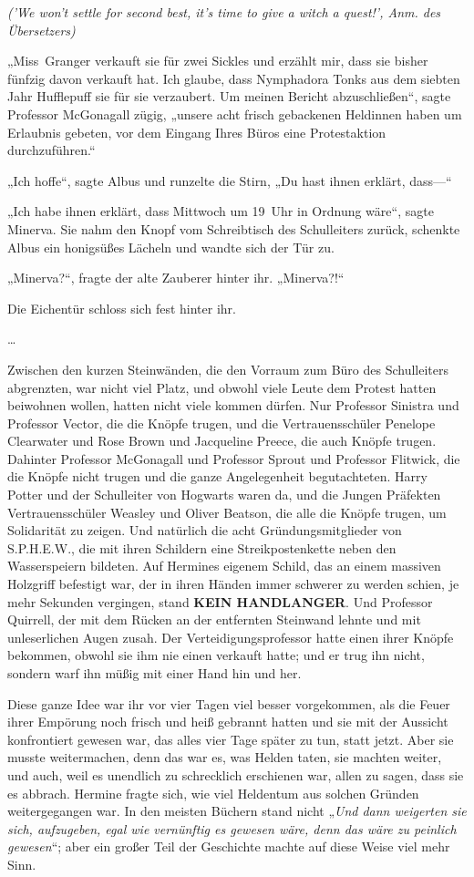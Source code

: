 {\emph{('We won't settle for second best, it's time to give a witch a quest!', Anm. des Übersetzers)}

„Miss~Granger verkauft sie für zwei Sickles und erzählt mir, dass sie bisher fünfzig davon verkauft hat. Ich glaube, dass Nymphadora Tonks aus dem siebten Jahr Hufflepuff sie für sie verzaubert. Um meinen Bericht abzuschließen“, sagte Professor McGonagall zügig, „unsere acht frisch gebackenen Heldinnen haben um Erlaubnis gebeten, vor dem Eingang Ihres Büros eine Protestaktion durchzuführen.“

„Ich hoffe“, sagte Albus und runzelte die Stirn, „Du hast ihnen erklärt, dass—“

„Ich habe ihnen erklärt, dass Mittwoch um 19~Uhr in Ordnung wäre“, sagte Minerva. Sie nahm den Knopf vom Schreibtisch des Schulleiters zurück, schenkte Albus ein honigsüßes Lächeln und wandte sich der Tür zu.

„Minerva?“, fragte der alte Zauberer hinter ihr. „Minerva?!“

Die Eichentür schloss sich fest hinter ihr.

…

Zwischen den kurzen Steinwänden, die den Vorraum zum Büro des Schulleiters abgrenzten, war nicht viel Platz, und obwohl viele Leute dem Protest hatten beiwohnen wollen, hatten nicht viele kommen dürfen. Nur Professor Sinistra und Professor Vector, die die Knöpfe trugen, und die Vertrauensschüler Penelope Clearwater und Rose Brown und Jacqueline Preece, die auch Knöpfe trugen. Dahinter Professor McGonagall und Professor Sprout und Professor Flitwick, die die Knöpfe nicht trugen und die ganze Angelegenheit begutachteten. Harry Potter und der Schulleiter von Hogwarts waren da, und die Jungen Präfekten Vertrauensschüler Weasley und Oliver Beatson, die alle die Knöpfe trugen, um Solidarität zu zeigen. Und natürlich die acht Gründungsmitglieder von S.P.H.E.W., die mit ihren Schildern eine Streikpostenkette neben den Wasserspeiern bildeten. Auf Hermines eigenem Schild, das an einem massiven Holzgriff befestigt war, der in ihren Händen immer schwerer zu werden schien, je mehr Sekunden vergingen, stand \textbf{KEIN HANDLANGER}. Und Professor Quirrell, der mit dem Rücken an der entfernten Steinwand lehnte und mit unleserlichen Augen zusah. Der Verteidigungsprofessor hatte einen ihrer Knöpfe bekommen, obwohl sie ihm nie einen verkauft hatte; und er trug ihn nicht, sondern warf ihn müßig mit einer Hand hin und her.

Diese ganze Idee war ihr vor vier Tagen viel besser vorgekommen, als die Feuer ihrer Empörung noch frisch und heiß gebrannt hatten und sie mit der Aussicht konfrontiert gewesen war, das alles vier Tage später zu tun, statt jetzt. Aber sie musste weitermachen, denn das war es, was Helden taten, sie machten weiter, und auch, weil es unendlich zu schrecklich erschienen war, allen zu sagen, dass sie es abbrach. Hermine fragte sich, wie viel Heldentum aus solchen Gründen weitergegangen war. In den meisten Büchern stand nicht „\emph{Und dann weigerten sie sich, aufzugeben, egal wie vernünftig es gewesen wäre, denn das wäre zu peinlich gewesen}“; aber ein großer Teil der Geschichte machte auf diese Weise viel mehr Sinn.

}
